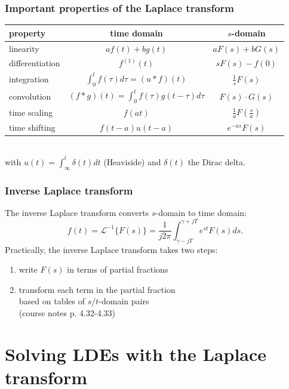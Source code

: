 \begin{frame}
\frametitle{Important properties of the Laplace transform}
\centering
\begin{tabular}{lcc}
\textbf{property}	& \textbf{time domain}	& \textbf{$s$-domain} \\
\midrule
linearity	& $af(t)+bg(t)$ & $aF(s) + bG(s)$ \\
\vspace{4ex}
differentiation	& $f^{(1)}(t)$	& $s F(s) - f(0)$ \\
\vspace{4ex}
integration	& $\int_0^t f(\tau)d\tau = (u*f)(t)$	&	$\frac{1}{s}F(s)$ \\
\vspace{4ex}
convolution	& $(f * g)(t)=\int_0^t f(\tau)g(t-\tau)d\tau$	& $F(s)\cdot G(s)$ \\
\vspace{4ex}
time scaling	& $f(at)$	& $\frac{1}{a}F(\frac{s}{a})$ \\
\vspace{4ex}
time shifting	& $f(t-a)u(t-a)$	& $e^{-as} F(s)$ \\
\end{tabular} \\
with $u(t)=\int_\infty^t \delta(t)dt$ (Heaviside) and $\delta(t)$ the Dirac delta.
\end{frame}


\begin{frame}
\frametitle{Inverse Laplace transform}
The inverse Laplace transform converts $s$-domain to time domain:
\begin{equation*}
f(t) = \mathcal{L}^{-1}\{F(s)\} = \frac{1}{j2\pi}\int_{\gamma-jT}^{\gamma+jT} e^{st} F(s) ds.
\end{equation*}
Practically, the inverse Laplace transform takes two steps:
\begin{enumerate}
\item write $F(s)$ in terms of partial fractions
\item transform each term in the partial fraction \\ based on tables of $s$/$t$-domain pairs \\ (course notes p. 4.32-4.33)
\end{enumerate}
\end{frame}

\section{Solving LDEs with the Laplace transform}

